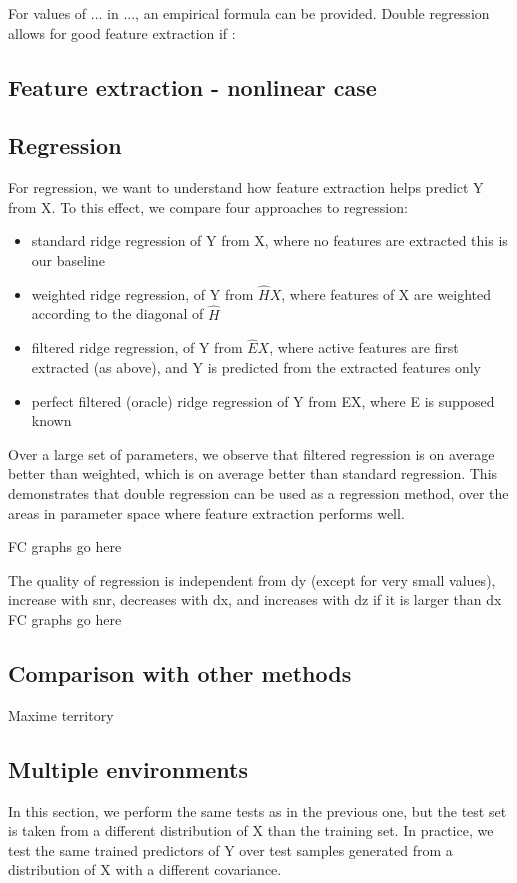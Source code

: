 \documentclass{article}
\begin{document}
For values of ...
%
in ..., an empirical formula can be provided.
%
Double regression allows for good feature extraction if :

\subsection{Feature extraction - nonlinear case}


\subsection{Regression }
For regression, we want to understand how feature extraction helps predict Y from X.
%
To this effect, we compare four approaches to regression:
\begin{itemize}
\item standard ridge regression of Y from X, where no features are extracted this is our baseline
\item weighted ridge regression, of Y from $\hat H X$, where features of X are weighted according to the diagonal of $\hat H$
\item filtered ridge regression, of Y from $\hat E X$, where active features are first extracted (as above), and Y is predicted from the extracted features only
\item perfect filtered (oracle) ridge regression of Y from EX, where E is supposed known
\end{itemize}
Over a large set of parameters, we observe that filtered regression is on average better than weighted, which is on average better than standard regression.
%
This demonstrates that double regression can be used as a regression method, over the areas in parameter space where feature extraction performs well.

FC graphs go here

The quality of regression is independent from dy (except for very small values), increase with snr, decreases with dx, and increases with dz if it is larger than dx
FC graphs go here

\subsection{Comparison with other methods}
Maxime territory

\subsection{Multiple environments}
In this section, we perform the same tests as in the previous one, but the test set is taken from a different distribution of X than the training set.
%
In practice, we test the same trained predictors of Y over test samples generated from a distribution of X with a different covariance.
\end{document}
